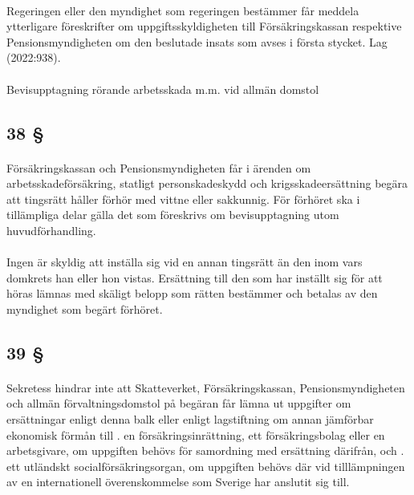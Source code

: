 \documentclass[a4paper,notitlepage,openany,10pt]{book}
\begin{document}
\paragraph*{}
Regeringen eller den myndighet som regeringen bestämmer får meddela ytterligare föreskrifter om uppgiftsskyldigheten till Försäkringskassan respektive Pensionsmyndigheten om den beslutade insats som avses i första stycket.
Lag (2022:938).
\paragraph*{}
Bevisupptagning rörande arbetsskada m.m. vid allmän domstol
\subsection*{38 §}
\paragraph*{}
Försäkringskassan och Pensionsmyndigheten får i ärenden om arbetsskadeförsäkring, statligt personskadeskydd och krigsskadeersättning begära att tingsrätt håller förhör med vittne eller sakkunnig. För förhöret ska i tillämpliga delar gälla det som föreskrivs om bevisupptagning utom huvudförhandling.
\paragraph*{}
Ingen är skyldig att inställa sig vid en annan tingsrätt än den inom vars domkrets han eller hon vistas. Ersättning till den som har inställt sig för att höras lämnas med skäligt belopp som rätten bestämmer och betalas av den myndighet som begärt förhöret.
\subsection*{39 §}
\paragraph*{}
Sekretess hindrar inte att Skatteverket, Försäkringskassan, Pensionsmyndigheten och allmän förvaltningsdomstol på begäran får lämna ut uppgifter om ersättningar enligt denna balk eller enligt lagstiftning om annan jämförbar ekonomisk förmån till
. en försäkringsinrättning, ett försäkringsbolag eller en arbetsgivare, om uppgiften behövs för samordning med ersättning därifrån, och
. ett utländskt socialförsäkringsorgan, om uppgiften behövs där vid tilllämpningen av en internationell överenskommelse som Sverige har anslutit sig till.
\end{document}
